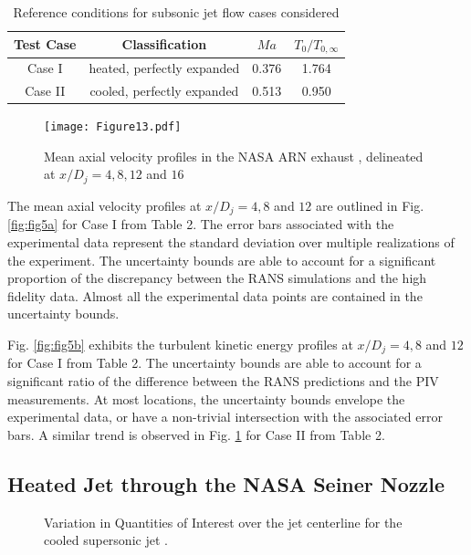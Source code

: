 \begin{table}
\caption{\label{tab:table2} Reference conditions for subsonic jet flow cases considered}
\begin{center}
\begin{tabular}{cccc}
Test Case& Classification& $Ma$& ${T_0}/{T_{0,\infty}}$\\\hline
Case I& heated, perfectly expanded& 0.376& 1.764\\
Case II& cooled, perfectly expanded& 0.513& 0.950\\
\end{tabular}
\end{center}
\end{table}

\begin{figure}
\texttt{[image: Figure13.pdf]}
\caption{Mean axial velocity profiles in the NASA ARN exhaust , delineated at $x/D_j= 4,8,12$ and $16$\label{fig:fig5}}
\end{figure}

The mean axial velocity profiles at $x/D_j= 4,8$ and $12$ are outlined in Fig. \ref{fig:fig5a} for Case I from Table 2. The error bars associated with the experimental data represent the standard deviation over multiple realizations of the experiment. The uncertainty bounds are able to account for a significant proportion of the discrepancy between the RANS simulations and the high fidelity data. Almost all the experimental data points are contained in the uncertainty bounds. 

Fig. \ref{fig:fig5b} exhibits the turbulent kinetic energy profiles at $x/D_j= 4,8$ and $12$ for Case I from Table 2. The uncertainty bounds are able to account for a significant ratio of the difference between the RANS predictions and the PIV measurements. At most locations, the uncertainty bounds envelope the experimental data, or have a non-trivial intersection with the associated error bars. A similar trend is observed in Fig. \ref{fig:fig5} for Case II from Table 2.



\subsection{Heated Jet through the NASA Seiner Nozzle}


\begin{figure}
\caption{Variation in Quantities of Interest over the jet centerline for the cooled supersonic jet \cite{seiner}.}
\end{figure}

